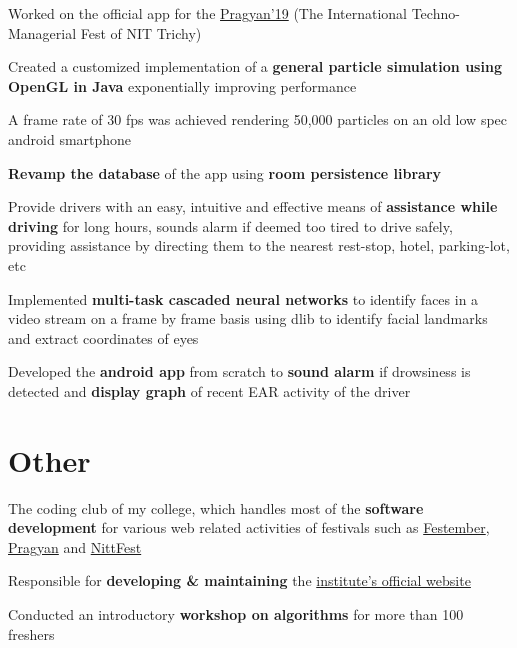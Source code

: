 \documentclass[]{deedy-resume-openfont}
\begin{document}
\begin{minipage}[t]{0.69\textwidth}
\begin{tightemize}
\item Worked on the official app for the \href{https://www.pragyan.org/19/home/}{Pragyan’19} (The International Techno-Managerial Fest of NIT Trichy) \item Created a customized implementation of a \textbf{general particle simulation using OpenGL in Java} exponentially improving performance \item A frame rate of 30 fps was achieved rendering 50,000 particles on an old low spec android smartphone \item \textbf{Revamp the database} of the app using \textbf{room persistence library}
\end{tightemize}
\sectionsep

\begin{tightemize}
\item Provide drivers with an easy, intuitive and effective means of \textbf{assistance while driving} for long hours, sounds alarm if deemed too tired to drive safely, providing assistance by directing them to the nearest rest-stop, hotel, parking-lot, etc \item Implemented \textbf{multi-task cascaded neural networks} to identify faces in a video stream on a frame by frame basis using dlib to identify facial landmarks and extract coordinates of eyes \item Developed the \textbf{android app} from scratch to \textbf{sound alarm} if drowsiness is detected and \textbf{display graph} of recent EAR activity of the driver
\end{tightemize}
\sectionsep

\section{Other}
\begin{tightemize}
\item The coding club of my college, which handles most of the \textbf{software development} for various web related activities of festivals such as \href{https://festember.com}{Festember}, \href{https://www.pragyan.org}{Pragyan} and \href{https://www.nittfest.in/}{NittFest} \item Responsible for \textbf{developing \& maintaining} the \href{https://www.nitt.edu/}{institute's official website} \item Conducted an introductory \textbf{workshop on algorithms} for more than 100 freshers
\end{tightemize}
\sectionsep

\end{minipage}
\end{document}
